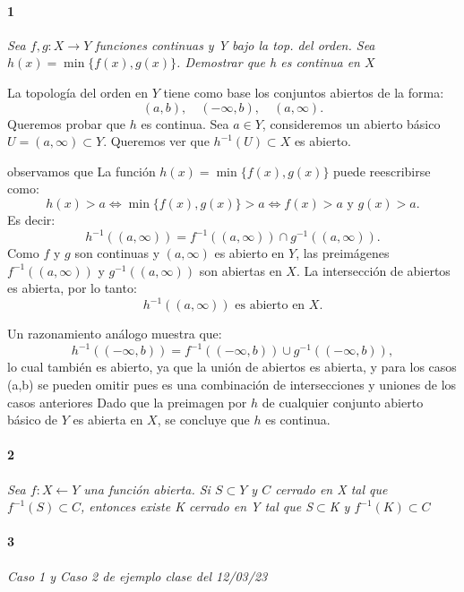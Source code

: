 \documentclass[12pt]{article}
\author{Alumnos: \\Arturo Rodriguez Contreras - 2132880 \\
Jonathan Raymundo Torres Cardenas - 1949731\\
Praxedis Jimenes Ruvalcaba \\
Erick Román Montemayor Treviño - 1957959 \\
Alexis Noe Mora Leyva \\
Everardo Flores Rivera - 2127301}
\begin{document}
\maketitle

\paragraph{1}
\textit{Sea $f,g:X \to Y$ funciones continuas y Y bajo la top. del orden. Sea $h(x)=\min{\{f(x),g(x)\}}$. Demostrar que h es continua en $X$}

La topología del orden en \( Y \) tiene como base los conjuntos abiertos de la forma:
\[
(a, b),\quad (-\infty, b),\quad (a, \infty).
\]
Queremos probar que \( h \) es continua.  
Sea \( a \in Y \), consideremos un abierto básico \( U = (a, \infty) \subset Y \).  
Queremos ver que \( h^{-1}(U) \subset X \) es abierto.

observamos que
La función \( h(x) = \min\{f(x), g(x)\} \) puede reescribirse como:
\[
h(x) > a \iff \min\{f(x), g(x)\} > a \iff f(x) > a \text{ y } g(x) > a.
\]
Es decir:
\[
h^{-1}((a, \infty)) = f^{-1}((a, \infty)) \cap g^{-1}((a, \infty)).
\]
Como \( f \) y \( g \) son continuas y \( (a, \infty) \) es abierto en \( Y \), las preimágenes \( f^{-1}((a, \infty)) \) y \( g^{-1}((a, \infty)) \) son abiertas en \( X \).  
La intersección de abiertos es abierta, por lo tanto:
\[
h^{-1}((a, \infty)) \text{ es abierto en } X.
\]

Un razonamiento análogo muestra que:
\[
h^{-1}((-\infty, b)) = f^{-1}((-\infty, b)) \cup g^{-1}((-\infty, b)),
\]
lo cual también es abierto, ya que la unión de abiertos es abierta, y para los casos  (a,b) se pueden omitir pues es una combinación de intersecciones y uniones de los casos anteriores    
Dado que la preimagen por \( h \) de cualquier conjunto abierto básico de \( Y \) es abierta en \( X \), se concluye que \( h \) es continua.

\paragraph{2}
\textit{Sea $f:X\leftarrow Y$ una función abierta. Si $S \subset Y$ y $C$ cerrado en X tal que $f^{-1}(S)\subset C$, entonces existe K cerrado en Y tal que S$\subset$K y $f^{-1}(K)\subset C$}

\paragraph{3}
\textit{Caso 1 y Caso 2 de ejemplo clase del 12/03/23} 
\end{document}
